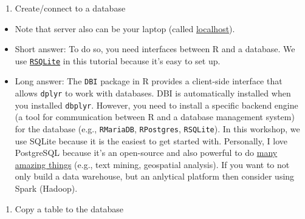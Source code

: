 \documentclass[
]{book}
\providecommand{\tightlist}{%
  \setlength{\itemsep}{0pt}\setlength{\parskip}{0pt}}
\begin{document}
\begin{enumerate}
\def\labelenumi{\arabic{enumi}.}
\tightlist
\item
  Create/connect to a database
\end{enumerate}

\begin{itemize}
\item
  Note that server also can be your laptop (called \href{https://en.wikipedia.org/wiki/Localhost\#:~:text=In\%20computer\%20networking\%2C\%20localhost\%20is,via\%20the\%20loopback\%20network\%20interface.}{localhost}).
\item
  Short answer: To do so, you need interfaces between R and a database. We use \href{https://github.com/r-dbi/RSQLite}{\texttt{RSQLite}} in this tutorial because it's easy to set up.
\item
  Long answer: The \texttt{DBI} package in R provides a client-side interface that allows \texttt{dplyr} to work with databases. DBI is automatically installed when you installed \texttt{dbplyr}. However, you need to install a specific backend engine (a tool for communication between R and a database management system) for the database (e.g., \texttt{RMariaDB}, \texttt{RPostgres}, \texttt{RSQLite}). In this workshop, we use SQLite because it is the easiest to get started with. Personally, I love PostgreSQL because it's an open-source and also powerful to do \href{https://www.postgresql.org/docs/current/functions.html}{many amazing things} (e.g., text mining, geospatial analysis). If you want to not only build a data warehouse, but an anlytical platform then consider using Spark (Hadoop).
\end{itemize}

\begin{enumerate}
\def\labelenumi{\arabic{enumi}.}
\setcounter{enumi}{1}
\tightlist
\item
  Copy a table to the database
\end{enumerate}
\end{document}
